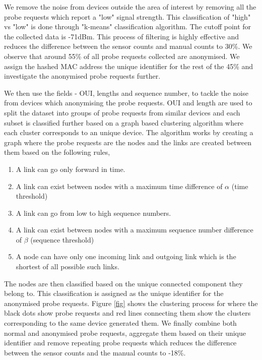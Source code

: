 \documentclass[11t, a4paper, twocolumn]{article}
\begin{document}
	We remove the noise from devices outside the area of interest 
	by removing all the probe requests which report a "low" signal strength.
	This classification of "high" vs "low" is done through "k-means"
	classification algorithm.
	The cutoff point for the collected data is -71dBm.
	This process of filtering is highly effective and reduces the difference
	between the sensor counts and manual counts to 30\%. We observe that
	around 55\% of all probe requests collected are anonymised.
	We assign the hashed MAC address the unique identifier for the rest of
	the 45\% and investigate the anonymised probe requests further.
	
	We then use the fields - OUI, lengths and sequence number,
	to tackle the noise from devices which anonymising the probe requests.
	OUI and length are used to split the dataset into
	groups of probe requests from similar
	devices and each subset is classified further
	based on a graph based clustering algorithm 
	where each cluster corresponds to an unique device.
	The algorithm works by creating a graph where the probe requests
	are the nodes and the links are created
	between them based on the following rules,

	\begin{enumerate}
		\item A link can go only forward in time.
		\item A link can exist between nodes with a 
			maximum time difference of $\alpha$ (time threshold)
		\item A link can go from low to high sequence numbers.
		\item A link can exist between nodes with a
			maximum sequence number difference of $\beta$ (sequence threshold)
		\item A node can have only one incoming link and outgoing link
			which is the shortest of all possible such links.
	\end{enumerate}

	The nodes are then classified based on the unique connected component they
	belong to. This classification is assigned as the unique identifier for the
	anonymised probe requests.
	Figure \ref{fig} shows the clustering process for where the black dots show
	probe requests and red lines connecting them show the clusters
	corresponding to the same device generated them.
	We finally combine both normal and anonymised probe requests, 
	aggregate them based on their unique identifier and remove
	repeating probe requests which reduces the difference between
	the sensor counts and the manual counts to -18\%.
\end{document}
